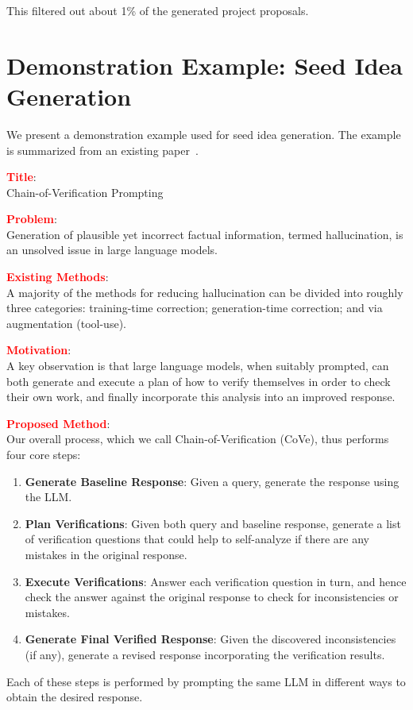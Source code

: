 This filtered out about 1\% of the generated project proposals.

\newpage


\section{Demonstration Example: Seed Idea Generation}
\label{sec:demo_example_seed_idea_gen}

We present a demonstration example used for seed idea generation. The example is summarized from an existing paper~\cite{Dhuliawala2023ChainofVerificationRH}. 

\vspace{8pt}

\textbf{\textcolor{red}{Title}}: \\
Chain-of-Verification Prompting 


\textbf{\textcolor{red}{Problem}}: \\
Generation of plausible yet incorrect factual information, termed hallucination, is an unsolved issue in large language models. 

\textbf{\textcolor{red}{Existing Methods}}: \\
A majority of the methods for reducing hallucination can be divided into roughly three categories: training-time correction;  generation-time correction; and via augmentation (tool-use). 

\textbf{\textcolor{red}{Motivation}}: \\
A key observation is that large language models, when suitably prompted, can both generate and execute a plan of how to verify themselves in order to check their own work, and finally incorporate this analysis into an improved response. 

\textbf{\textcolor{red}{Proposed Method}}: \\
Our overall process, which we call Chain-of-Verification (CoVe), thus performs four core steps:
\begin{enumerate}[label=(\arabic*), topsep=0pt, itemsep=0pt]
    \item \textbf{Generate Baseline Response}: Given a query, generate the response using the LLM.
    \item \textbf{Plan Verifications}: Given both query and baseline response, generate a list of verification questions that could help to self-analyze if there are any mistakes in the original response.
    \item \textbf{Execute Verifications}: Answer each verification question in turn, and hence check the answer against the original response to check for inconsistencies or mistakes.
    \item \textbf{Generate Final Verified Response}: Given the discovered inconsistencies (if any), generate a revised response incorporating the verification results.
\end{enumerate}
Each of these steps is performed by prompting the same LLM in different ways to obtain the desired response. 

